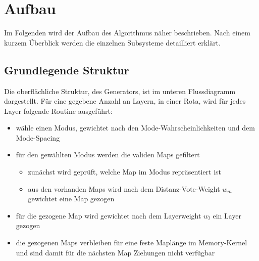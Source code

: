 \section{Aufbau}
    Im Folgenden wird der Aufbau des Algorithmus näher beschrieben. 
    Nach einem kurzem Überblick werden die einzelnen Subsysteme detailliert erklärt.
    \subsection{Grundlegende Struktur}
    Die oberflächliche Struktur, des Generators, ist im unteren Flussdiagramm dargestellt. 
    Für eine gegebene Anzahl an Layern, in einer Rota, wird für jedes Layer folgende Routine ausgeführt:
    \begin{itemize}
        \item wähle einen Modus, gewichtet nach den Mode-Wahrscheinlichkeiten und dem Mode-Spacing
        \item für den gewählten Modus werden die validen Maps gefiltert
        \begin{itemize}
            \item zunächst wird geprüft, welche Map im Modus repräsentiert ist
            \item aus den vorhanden Maps wird nach dem Distanz-Vote-Weight $w_m$ gewichtet eine Map gezogen
        \end{itemize}
        \item für die gezogene Map wird gewichtet nach dem Layerweight $w_l$ ein Layer gezogen
        \item die gezogenen Maps verbleiben für eine feste Maplänge im Memory-Kernel und sind damit für die nächsten Map Ziehungen nicht verfügbar
    \end{itemize}
